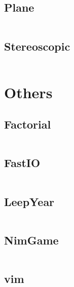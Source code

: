 \documentclass[a4paper,11pt]{article}
\begin{document}
\subsection{Plane}
\inputminted[breaklines]{c++}{06++ComputationalGeometry/+Plane.cpp}
\subsection{Stereoscopic}
\inputminted[breaklines]{c++}{06++ComputationalGeometry/+Stereoscopic.cpp}

\newpage
\section{Others}
\subsection{Factorial}
\inputminted[breaklines]{c++}{07++Others/+Factorial.cpp}
\subsection{FastIO}
\inputminted[breaklines]{c++}{07++Others/+FastIO.cpp}
\subsection{LeepYear}
\inputminted[breaklines]{c++}{07++Others/+LeepYear.cpp}
\subsection{NimGame}
\inputminted[breaklines]{c++}{07++Others/+NimGame.cpp}
\subsection{vim}
\inputminted[breaklines]{c++}{07++Others/+vim.vim}

\newpage
\end{document}
